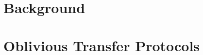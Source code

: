 \documentclass[a4paper,11pt,twoside,openright]{memoir}
\theoremstyle{definition}
\theoremstyle{remark}
\begin{document}
\pagestyle{ruled}



\frontmatter


\tableofcontents


\mainmatter

\part{Background}



\part{Oblivious Transfer Protocols}




\backmatter

%



\end{document}
